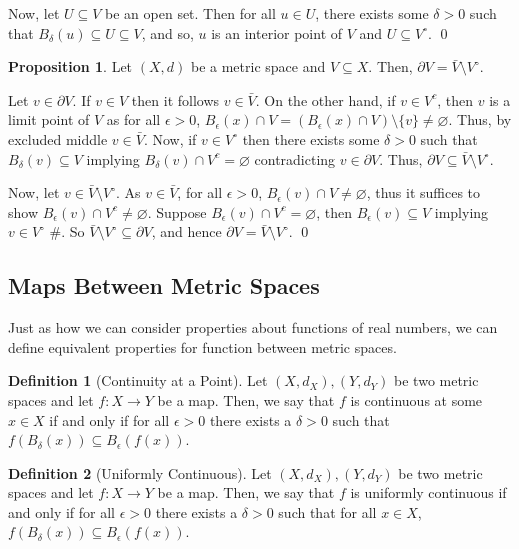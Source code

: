 \documentclass[
]{article}
\theoremstyle{definition}
\newtheorem{prop}{Proposition}
\theoremstyle{definition}
\newtheorem{definition}{Definition}[section]
\begin{document}
Now, let \(U \subseteq V\) be an open set. Then for all \(u \in U\),
there exists some \(\delta > 0\) such that
\(B_\delta(u) \subseteq U \subseteq V\), and so, \(u\) is an interior
point of \(V\) and \(U \subseteq V^\circ\). \qed

\begin{prop}
  Let \((X, d)\) be a metric space and \(V \subseteq X\). Then, 
  \(\partial V = \bar{V} \setminus V^\circ\).
\end{prop}
\proof

Let \(v \in \partial V\). If \(v \in V\) then it follows
\(v \in \bar{V}\). On the other hand, if \(v \in V^c\), then \(v\) is a
limit point of \(V\) as for all \(\epsilon > 0\),
\(B_\epsilon(x) \cap V =  (B_\epsilon(x) \cap V) \setminus \{v\} \neq \varnothing\).
Thus, by excluded middle \(v \in \bar{V}\). Now, if \(v \in V^\circ\)
then there exists some \(\delta > 0\) such that
\(B_\delta(v) \subseteq V\) implying
\(B_\delta(v) \cap V^c = \varnothing\) contradicting
\(v \in \partial V\). Thus,
\(\partial V \subseteq \bar{V} \setminus V^\circ\).

Now, let \(v \in \bar{V} \setminus V^\circ\). As \(v \in \bar{V}\), for
all \(\epsilon > 0\), \(B_\epsilon (v) \cap V \neq \varnothing\), thus
it suffices to show \(B_\epsilon (v) \cap V^c \neq \varnothing\).
Suppose \(B_\epsilon (v) \cap V^c = \varnothing\), then
\(B_\epsilon (v) \subseteq V\) implying \(v \in V^\circ\) \#. So
\(\bar{V} \setminus V^\circ \subseteq \partial V\), and hence
\(\partial V = \bar{V} \setminus V^\circ\). \qed

\hypertarget{maps-between-metric-spaces}{%
\subsection{Maps Between Metric
Spaces}\label{maps-between-metric-spaces}}

Just as how we can consider properties about functions of real numbers,
we can define equivalent properties for function between metric spaces.

\begin{definition}[Continuity at a Point]
  Let \((X, d_X), (Y, d_Y)\) be two metric spaces and let \(f : X \to Y\) be 
  a map. Then, we say that \(f\) is continuous at some \(x \in X\) if and only if 
  for all \(\epsilon > 0\) there exists a \(\delta > 0\) such that 
  \(f(B_\delta(x)) \subseteq B_\epsilon(f(x))\).  
\end{definition}

\begin{definition}[Uniformly Continuous]
  Let \((X, d_X), (Y, d_Y)\) be two metric spaces and let \(f : X \to Y\) be 
  a map. Then, we say that \(f\) is uniformly continuous if and only if 
  for all \(\epsilon > 0\) there exists a \(\delta > 0\) such that for 
  all \(x \in X\), \(f(B_\delta(x)) \subseteq B_\epsilon(f(x))\).  
\end{definition}
\end{document}
